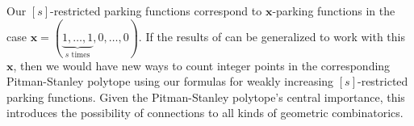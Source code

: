 \documentclass[12pt]{article}
\begin{document}
Our $[s]$-restricted parking functions correspond to $\mathbf{x}$-parking functions in the case $\mathbf{x} = (\underbrace{1, \dots, 1}_{s \text{ times}}, 0, \dots, 0)$. If the results of \cite{andres-others-2023} can be generalized to work with this $\mathbf{x}$, then we would have new ways to count integer points in the corresponding Pitman-Stanley polytope using our formulas for weakly increasing $[s]$-restricted parking functions. Given the Pitman-Stanley polytope's central importance, this introduces the possibility of connections to all kinds of geometric combinatorics.



\end{document}
